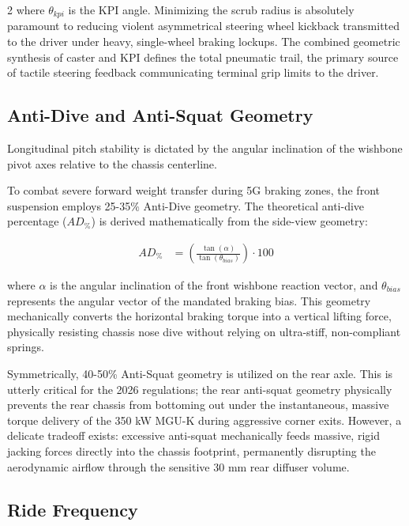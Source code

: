 \begin{multicols}{2}
where $\theta_{kpi}$ is the KPI angle. Minimizing the scrub radius is absolutely paramount to reducing violent asymmetrical steering wheel kickback transmitted to the driver under heavy, single-wheel braking lockups. The combined geometric synthesis of caster and KPI defines the total pneumatic trail, the primary source of tactile steering feedback communicating terminal grip limits to the driver.

\subsection{Anti-Dive and Anti-Squat Geometry}

Longitudinal pitch stability is dictated by the angular inclination of the wishbone pivot axes relative to the chassis centerline. 

To combat severe forward weight transfer during 5G braking zones, the front suspension employs 25-35\% Anti-Dive geometry. The theoretical anti-dive percentage ($AD_{\%}$) is derived mathematically from the side-view geometry:

\begin{equation} \label{eq:anti_dive}
\begin{split}
AD_{\%} &= \left( \frac{\tan(\alpha)}{\tan(\theta_{bias})} \right) \cdot 100
\end{split}
\end{equation}

where $\alpha$ is the angular inclination of the front wishbone reaction vector, and $\theta_{bias}$ represents the angular vector of the mandated braking bias. This geometry mechanically converts the horizontal braking torque into a vertical lifting force, physically resisting chassis nose dive without relying on ultra-stiff, non-compliant springs.

Symmetrically, 40-50\% Anti-Squat geometry is utilized on the rear axle. This is utterly critical for the 2026 regulations; the rear anti-squat geometry physically prevents the rear chassis from bottoming out under the instantaneous, massive torque delivery of the 350 kW MGU-K during aggressive corner exits. However, a delicate tradeoff exists: excessive anti-squat mechanically feeds massive, rigid jacking forces directly into the chassis footprint, permanently disrupting the aerodynamic airflow through the sensitive 30 mm rear diffuser volume.

\subsection{Ride Frequency}


\end{multicols}
